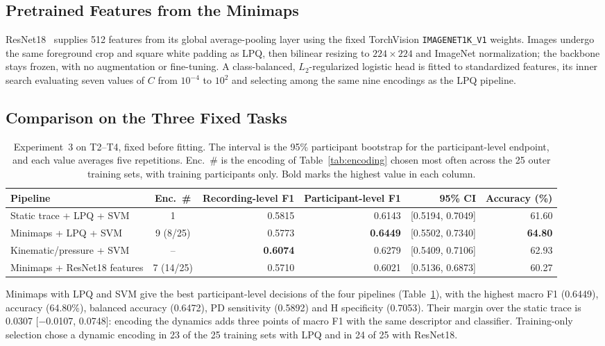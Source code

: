 \subsection{Pretrained Features from the Minimaps}
\noindent
ResNet18~\cite{He2016} supplies 512 features from its global average-pooling layer using the fixed TorchVision \texttt{IMAGENET1K\_V1} weights. Images undergo the same foreground crop and square white padding as LPQ, then bilinear resizing to $224\times224$ and ImageNet normalization; the backbone stays frozen, with no augmentation or fine-tuning. A class-balanced, $L_2$-regularized logistic head is fitted to standardized features, its inner search evaluating seven values of $C$ from $10^{-4}$ to $10^{2}$ and selecting among the same nine encodings as the LPQ pipeline.

\subsection{Comparison on the Three Fixed Tasks}
\begin{table}[t]
\centering\small
\caption{Experiment~3 on T2--T4, fixed before fitting. The interval is the 95\% participant bootstrap for the participant-level endpoint, and each value averages five repetitions. Enc.~\# is the encoding of Table~\ref{tab:encoding} chosen most often across the 25 outer training sets, with training participants only. Bold marks the highest value in each column.}
\label{tab:competitive}
\setlength{\tabcolsep}{4pt}
\begin{tabular}{@{}lcrrrr@{}}
\toprule
Pipeline & Enc.~\# & Recording-level F1 & Participant-level F1 & 95\% CI & Accuracy (\%)\\
\midrule
Static trace + LPQ + SVM & 1 & 0.5815 & 0.6143 & [0.5194, 0.7049] & 61.60\\
Minimaps + LPQ + SVM & 9 (8/25) & 0.5773 & \textbf{0.6449} & [0.5502, 0.7340] & \textbf{64.80}\\
Kinematic/pressure + SVM & -- & \textbf{0.6074} & 0.6279 & [0.5409, 0.7106] & 62.93\\
Minimaps + ResNet18 features & 7 (14/25) & 0.5710 & 0.6021 & [0.5136, 0.6873] & 60.27\\
\bottomrule
\end{tabular}
\end{table}
\noindent
Minimaps with LPQ and SVM give the best participant-level decisions of the four pipelines (Table~\ref{tab:competitive}), with the highest macro F1 (0.6449), accuracy (64.80\%), balanced accuracy (0.6472), PD sensitivity (0.5892) and H specificity (0.7053). Their margin over the static trace is 0.0307 [$-$0.0107, 0.0748]: encoding the dynamics adds three points of macro F1 with the same descriptor and classifier. Training-only selection chose a dynamic encoding in 23 of the 25 training sets with LPQ and in 24 of 25 with ResNet18.

